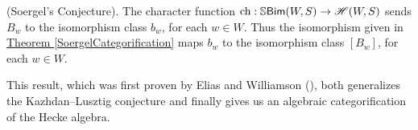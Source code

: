 \noindent\begin{theorem}\textnormal{(Soergel's Conjecture).} The character function $\textnormal{ch} : \mathbb{S}\textnormal{\textsf{Bim}}(W, S) \to \mathscr{H}(W, S)$ sends $B_w$ to the isomorphism class $b_w$, for each $w \in W$. Thus the isomorphism given in \hyperref[SoergelCategorification]{Theorem \ref*{SoergelCategorification}} maps $b_w$ to the isomorphism class $[B_w]$, for each $w \in W$.\\
\end{theorem}

\noindent This result, which was first proven by Elias and Williamson (\cite[Theorem 1.1]{EW14}), both generalizes the Kazhdan--Lusztig conjecture and finally gives us an algebraic categorification of the Hecke algebra.\\

